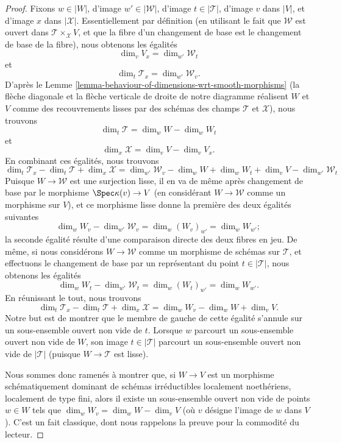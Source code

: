 \begin{proof}
\medskip\noindent
Fixons $w \in |W|$, d'image $w' \in |\mathcal{W}|$,
d'image $t \in |\mathcal{T}|$, d'image $v$ dans $|V|$,
et d'image $x$ dans $|\mathcal{X}|$.
Essentiellement par définition (en utilisant le
fait que $\mathcal{W}$ est ouvert dans $\mathcal{T}\times_{\mathcal{X}} V$, et que
la fibre d'un changement de base est le changement de base de la fibre),
nous obtenons les égalités
$$
\dim_v V_x = \dim_{w'} \mathcal{W}_t
$$
et
$$
\dim_t \mathcal{T}_x = \dim_{w'} \mathcal{W}_v.
$$
D'après le Lemme \ref{lemma-behaviour-of-dimensions-wrt-smooth-morphisms}
(la flèche diagonale et la flèche verticale de droite
de notre diagramme réalisent $W$ et $V$ comme des recouvrements lisses par des
schémas des champs $\mathcal{T}$ et $\mathcal{X}$), nous trouvons
$$
\dim_t \mathcal{T} = \dim_w W - \dim_w W_t
$$
et
$$
\dim_x \mathcal{X} = \dim_v V - \dim_v V_x.
$$
En combinant ces égalités, nous trouvons
$$
\dim_t \mathcal{T}_x - \dim_t \mathcal{T} + \dim_x \mathcal{X}
= \dim_{w'} \mathcal{W}_v - \dim_w W + \dim_w W_t + \dim_v V -
\dim_{w'} \mathcal{W}_t
$$
Puisque $W \to \mathcal{W}$ est une surjection lisse, il en va de même
après changement de base par le morphisme $\Spec \kappa(v) \to V$
(en considérant $W \to \mathcal{W}$ comme un morphisme sur $V$),
et ce morphisme lisse donne la première des deux
égalités suivantes
$$
\dim_w W_v - \dim_{w'} \mathcal{W}_v = \dim_w (W_v)_{w'} = \dim_w W_{w'};
$$
la seconde égalité résulte d'une comparaison directe des
deux fibres en jeu.
De même, si nous considérons $W \to \mathcal{W}$ comme un morphisme de schémas
sur $\mathcal{T}$, et effectuons le changement de base par un représentant du point
$t \in |\mathcal{T}|$, nous obtenons les égalités
$$
\dim_w W_t - \dim_{w'} \mathcal{W}_t = \dim_w (W_t)_{w'} = \dim_w W_{w'}.
$$
En réunissant le tout, nous trouvons
$$
\dim_t \mathcal{T}_x - \dim_t \mathcal{T} + \dim_x \mathcal{X}
=  \dim_w W_v - \dim_w W + \dim_v V.
$$
Notre but est de montrer que le membre de gauche de cette égalité
s'annule sur un sous-ensemble ouvert non vide
de $t$. Lorsque $w$ parcourt un sous-ensemble ouvert non vide de $W$,
son image $t \in |\mathcal{T}|$ parcourt un sous-ensemble ouvert non vide
de $|\mathcal{T}|$ (puisque $W \to \mathcal{T}$ est lisse).

\medskip\noindent
Nous sommes donc ramenés à montrer que, si $W\to V$ est un
morphisme schématiquement dominant de schémas irréductibles localement
noethériens, localement de type fini,
alors il existe un sous-ensemble ouvert non vide de
points $w\in W$ tels que $\dim_w W_v =\dim_w W - \dim_v V$
(où $v$ désigne l'image de $w$ dans $V$).
C'est un fait classique,
dont nous rappelons la preuve pour la commodité du lecteur.


\end{proof}
